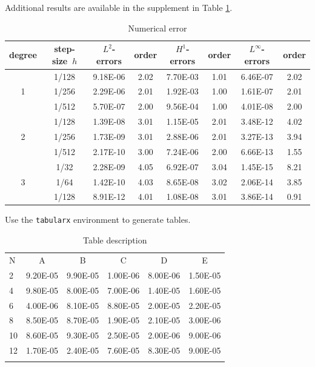 \documentclass[openany,twoside,12pt]{book}
\theoremstyle{plain}
\numberwithin{equation}{chapter}
\numberwithin{figure}{chapter}
\numberwithin{table}{chapter}
\begin{document}
Additional results are available in the supplement in Table \ref{tab:foo}.

\begin{table}[!htp]
\centering
\renewcommand\arraystretch{1.2} %
\caption{Numerical error}
\label{tab:foo}
\begin{tabular}{c|c|cc|cc|cc}
\hline
degree &  step-size~$h$  & $L^2$-errors  &  order  & $H^1$-errors & order & $L^\infty$-errors  &  order \\
\hline
   &  1/128    & 9.18E-06    &2.02    & 7.70E-03  &1.01       & 6.46E-07    &2.02   \\
1  &  1/256    & 2.29E-06    &2.01    & 1.92E-03  &1.00       & 1.61E-07    &2.01   \\
   &  1/512    & 5.70E-07    &2.00    & 9.56E-04  &1.00       & 4.01E-08    &2.00   \\
\hline  %
   &  1/128    & 1.39E-08    &3.01    & 1.15E-05  &2.01       & 3.48E-12   &4.02    \\
2  &  1/256    & 1.73E-09    &3.01    & 2.88E-06  &2.01       & 3.27E-13   &3.94    \\
   &  1/512    & 2.17E-10    &3.00    & 7.24E-06  &2.00       & 6.66E-13   &1.55    \\
\hline  %
   &  1/32     & 2.28E-09    &4.05    & 6.92E-07  &3.04       & 1.45E-15   &8.21    \\
3  &  1/64     & 1.42E-10    &4.03    & 8.65E-08  &3.02       & 2.06E-14   &3.85    \\
   &  1/128    & 8.91E-12    &4.01    & 1.08E-08  &3.01       & 3.86E-14   &0.91    \\
\hline
\end{tabular}
\end{table}

\clearpage
Use the \texttt{tabularx} environment to generate tables.

\begin{table}[htp!]
\centering
\renewcommand\arraystretch{1.2}
\caption{Table description}
\label{tab:error}
\begin{tabularx}{0.8\textwidth}{|P{0.8cm}|C|C|C|C|C|}
\Xhline{2\arrayrulewidth}
N  & A       & B    & C       & D      & E     \\
\Xhline{2\arrayrulewidth}
2  & 9.20E-05 & 9.90E-05 & 1.00E-06 & 8.00E-06 & 1.50E-05 \\
4  & 9.80E-05 & 8.00E-05 & 7.00E-06 & 1.40E-05 & 1.60E-05 \\
6  & 4.00E-06 & 8.10E-05 & 8.80E-05 & 2.00E-05 & 2.20E-05 \\
8  & 8.50E-05 & 8.70E-05 & 1.90E-05 & 2.10E-05 & 3.00E-06 \\
10 & 8.60E-05 & 9.30E-05 & 2.50E-05 & 2.00E-06 & 9.00E-06 \\
12 & 1.70E-05 & 2.40E-05 & 7.60E-05 & 8.30E-05 & 9.00E-05 \\
\Xhline{2\arrayrulewidth}
\end{tabularx}
\end{table}
\end{document}

